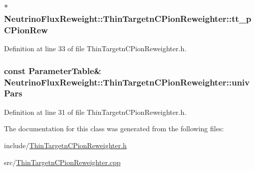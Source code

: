 \hypertarget{class_neutrino_flux_reweight_1_1_thin_targetn_c_pion_reweighter_a3cd598e2a95c1cf40db298236f3551c9}{
\subsubsection[{tt\-\_\-p\-C\-Pion\-Rew}]{$\ast$ Neutrino\-Flux\-Reweight\-::\-Thin\-Targetn\-C\-Pion\-Reweighter\-::tt\-\_\-p\-C\-Pion\-Rew\hspace{0.3cm}{\ttfamily [private]}}}\label{class_neutrino_flux_reweight_1_1_thin_targetn_c_pion_reweighter_a3cd598e2a95c1cf40db298236f3551c9}


Definition at line 33 of file Thin\-Targetn\-C\-Pion\-Reweighter.\-h.

\hypertarget{class_neutrino_flux_reweight_1_1_thin_targetn_c_pion_reweighter_a0ff3aa1a33a5e28c56f43ab9e6fa02b3}{
\subsubsection[{univ\-Pars}]{\setlength{\rightskip}{0pt plus 5cm}const {\bf Parameter\-Table}\& Neutrino\-Flux\-Reweight\-::\-Thin\-Targetn\-C\-Pion\-Reweighter\-::univ\-Pars\hspace{0.3cm}{\ttfamily [private]}}}\label{class_neutrino_flux_reweight_1_1_thin_targetn_c_pion_reweighter_a0ff3aa1a33a5e28c56f43ab9e6fa02b3}


Definition at line 31 of file Thin\-Targetn\-C\-Pion\-Reweighter.\-h.



The documentation for this class was generated from the following files\-:\begin{DoxyCompactItemize}
\item 
include/\hyperlink{_thin_targetn_c_pion_reweighter_8h}{Thin\-Targetn\-C\-Pion\-Reweighter.\-h}\item 
src/\hyperlink{_thin_targetn_c_pion_reweighter_8cpp}{Thin\-Targetn\-C\-Pion\-Reweighter.\-cpp}\end{DoxyCompactItemize}
